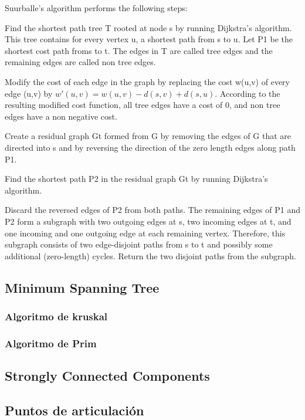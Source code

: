 \documentclass[10pt,letterpaper,twocolumn,twosided]{article}
\begin{document}
Suurballe's algorithm performs the following steps:

Find the shortest path tree T rooted at node s by running Dijkstra's algorithm. This tree contains for every vertex u,
a shortest path from s to u. Let P1 be the shortest cost path froms to t. The edges in T are called tree edges
and the remaining edges are called non tree edges.

Modify the cost of each edge in the graph by replacing the cost w(u,v) of every edge (u,v) 
by $w'(u,v) = w(u,v) - d(s,v) + d(s,u).$ According to the resulting modified cost function, all tree edges have a
cost of 0, and non tree edges have a non negative cost.

Create a residual graph Gt formed from G by removing the edges of G that are directed into s and by reversing 
the direction of the zero length edges along path P1.

Find the shortest path P2 in the residual graph Gt by running Dijkstra's algorithm.

Discard the reversed edges of P2 from both paths. The remaining edges of P1 and P2 form a subgraph with two 
outgoing edges at s, two incoming edges at t, and one incoming and one outgoing edge at each remaining vertex.
Therefore, this subgraph consists of two edge-disjoint paths from s to t and possibly some additional (zero-length)
cycles. Return the two disjoint paths from the subgraph.

\subsection{Minimum Spanning Tree}

\subsubsection{Algoritmo de kruskal}

\subsubsection{Algoritmo de Prim}

\subsection{Strongly Connected Components}

\subsection{Puntos de articulación}
\end{document}
